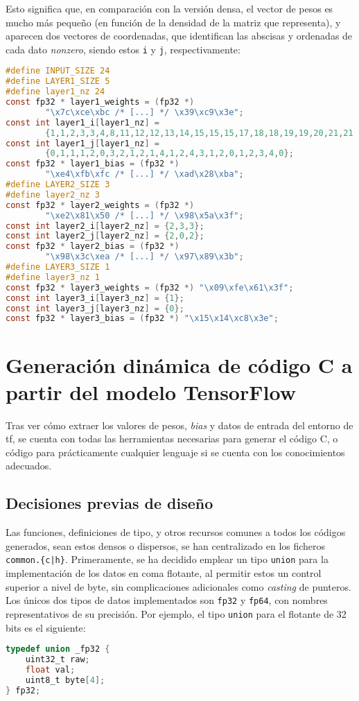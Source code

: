 Esto significa que, en comparación con la versión densa, el vector de pesos es mucho más pequeño (en función de la densidad de la matriz que representa), y aparecen dos vectores de coordenadas, que identifican las abscisas y ordenadas de cada dato \textit{nonzero}, siendo estos \texttt{i} y \texttt{j}, respectivamente:\medskip
\begin{lstlisting}[language=C]
#define INPUT_SIZE 24
#define LAYER1_SIZE 5
#define layer1_nz 24
const fp32 * layer1_weights = (fp32 *)
        "\x7c\xce\xbc /* [...] */ \x39\xc9\x3e";
const int layer1_i[layer1_nz] =
        {1,1,2,3,3,4,8,11,12,12,13,14,15,15,15,17,18,18,19,19,20,21,21,23};
const int layer1_j[layer1_nz] =
        {0,1,1,1,2,0,3,2,1,2,1,4,1,2,4,3,1,2,0,1,2,3,4,0};
const fp32 * layer1_bias = (fp32 *)
        "\xe4\xfb\xfc /* [...] */ \xad\x28\xba";
#define LAYER2_SIZE 3
#define layer2_nz 3
const fp32 * layer2_weights = (fp32 *)
        "\xe2\x81\x50 /* [...] */ \x98\x5a\x3f";
const int layer2_i[layer2_nz] = {2,3,3};
const int layer2_j[layer2_nz] = {2,0,2};
const fp32 * layer2_bias = (fp32 *)
        "\x98\x3c\xea /* [...] */ \x97\x89\x3b";
#define LAYER3_SIZE 1
#define layer3_nz 1
const fp32 * layer3_weights = (fp32 *) "\x09\xfe\x61\x3f";
const int layer3_i[layer3_nz] = {1};
const int layer3_j[layer3_nz] = {0};
const fp32 * layer3_bias = (fp32 *) "\x15\x14\xc8\x3e";
\end{lstlisting}


\section{Generación dinámica de código C a partir del modelo TensorFlow}
\label{sec:generacion_din_modelo_tf}
Tras ver cómo extraer los valores de pesos, \textit{bias} y datos de entrada del entorno de \acrlong{tf}, se cuenta con todas las herramientas necesarias para generar el código C, o código para prácticamente cualquier lenguaje si se cuenta con los conocimientos adecuados.

\subsection{Decisiones previas de diseño}
\label{ssec:decisiones_previas_diseno}
Las funciones, definiciones de tipo, y otros recursos comunes a todos los códigos generados, sean estos densos o dispersos, se han centralizado en los ficheros \texttt{common.\{c|h\}}. Primeramente, se ha decidido emplear un tipo \texttt{union} para la implementación de los datos en coma flotante, al permitir estos un control superior a nivel de byte, sin complicaciones adicionales como \textit{casting} de punteros. Los únicos dos tipos de datos implementados son \texttt{fp32} y \texttt{fp64}, con nombres representativos de su precisión. Por ejemplo, el tipo \texttt{union} para el flotante de 32 bits es el siguiente:\medskip
\begin{lstlisting}[language=C]
typedef union _fp32 {
    uint32_t raw;
    float val;
    uint8_t byte[4];
} fp32;
\end{lstlisting}

